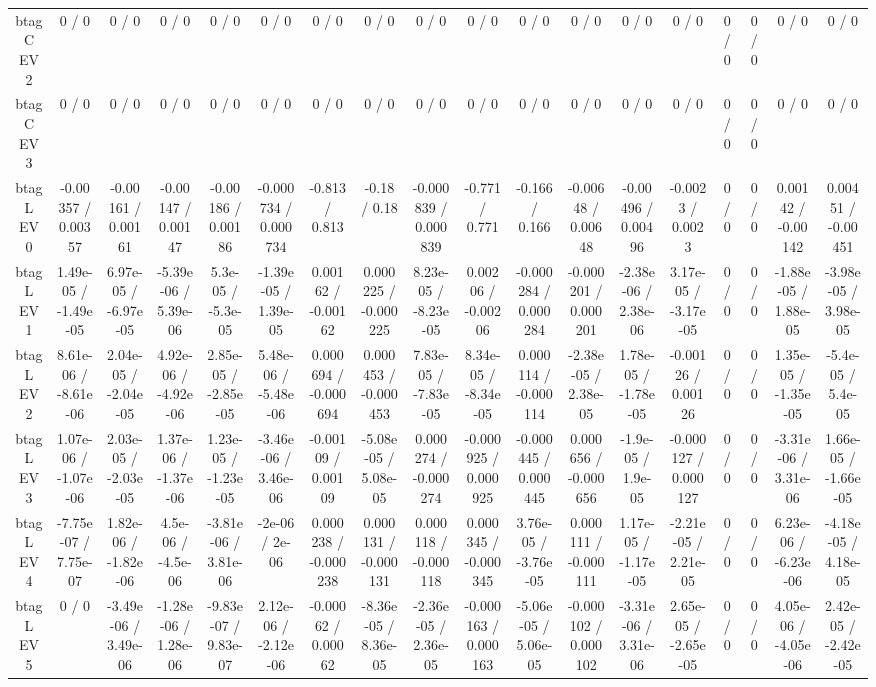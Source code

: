 \documentclass[10pt]{article}
\begin{document}
\begin{table}[htbp]
\begin{center}
\begin{tabular}{|c|c|c|c|c|c|c|c|c|c|c|c|c|c|c|c|c|c|}
  btag C EV 2 & 0 / 0 & 0 / 0 & 0 / 0 & 0 / 0 & 0 / 0 & 0 / 0 & 0 / 0 & 0 / 0 & 0 / 0 & 0 / 0 & 0 / 0 & 0 / 0 & 0 / 0 & 0 / 0 & 0 / 0 & 0 / 0 & 0 / 0 \\ 
  btag C EV 3 & 0 / 0 & 0 / 0 & 0 / 0 & 0 / 0 & 0 / 0 & 0 / 0 & 0 / 0 & 0 / 0 & 0 / 0 & 0 / 0 & 0 / 0 & 0 / 0 & 0 / 0 & 0 / 0 & 0 / 0 & 0 / 0 & 0 / 0 \\ 
  btag L EV 0 & -0.00357 / 0.00357 & -0.00161 / 0.00161 & -0.00147 / 0.00147 & -0.00186 / 0.00186 & -0.000734 / 0.000734 & -0.813 / 0.813 & -0.18 / 0.18 & -0.000839 / 0.000839 & -0.771 / 0.771 & -0.166 / 0.166 & -0.00648 / 0.00648 & -0.00496 / 0.00496 & -0.0023 / 0.0023 & 0 / 0 & 0 / 0 & 0.00142 / -0.00142 & 0.00451 / -0.00451 \\ 
  btag L EV 1 & 1.49e-05 / -1.49e-05 & 6.97e-05 / -6.97e-05 & -5.39e-06 / 5.39e-06 & 5.3e-05 / -5.3e-05 & -1.39e-05 / 1.39e-05 & 0.00162 / -0.00162 & 0.000225 / -0.000225 & 8.23e-05 / -8.23e-05 & 0.00206 / -0.00206 & -0.000284 / 0.000284 & -0.000201 / 0.000201 & -2.38e-06 / 2.38e-06 & 3.17e-05 / -3.17e-05 & 0 / 0 & 0 / 0 & -1.88e-05 / 1.88e-05 & -3.98e-05 / 3.98e-05 \\ 
  btag L EV 2 & 8.61e-06 / -8.61e-06 & 2.04e-05 / -2.04e-05 & 4.92e-06 / -4.92e-06 & 2.85e-05 / -2.85e-05 & 5.48e-06 / -5.48e-06 & 0.000694 / -0.000694 & 0.000453 / -0.000453 & 7.83e-05 / -7.83e-05 & 8.34e-05 / -8.34e-05 & 0.000114 / -0.000114 & -2.38e-05 / 2.38e-05 & 1.78e-05 / -1.78e-05 & -0.00126 / 0.00126 & 0 / 0 & 0 / 0 & 1.35e-05 / -1.35e-05 & -5.4e-05 / 5.4e-05 \\ 
  btag L EV 3 & 1.07e-06 / -1.07e-06 & 2.03e-05 / -2.03e-05 & 1.37e-06 / -1.37e-06 & 1.23e-05 / -1.23e-05 & -3.46e-06 / 3.46e-06 & -0.00109 / 0.00109 & -5.08e-05 / 5.08e-05 & 0.000274 / -0.000274 & -0.000925 / 0.000925 & -0.000445 / 0.000445 & 0.000656 / -0.000656 & -1.9e-05 / 1.9e-05 & -0.000127 / 0.000127 & 0 / 0 & 0 / 0 & -3.31e-06 / 3.31e-06 & 1.66e-05 / -1.66e-05 \\ 
  btag L EV 4 & -7.75e-07 / 7.75e-07 & 1.82e-06 / -1.82e-06 & 4.5e-06 / -4.5e-06 & -3.81e-06 / 3.81e-06 & -2e-06 / 2e-06 & 0.000238 / -0.000238 & 0.000131 / -0.000131 & 0.000118 / -0.000118 & 0.000345 / -0.000345 & 3.76e-05 / -3.76e-05 & 0.000111 / -0.000111 & 1.17e-05 / -1.17e-05 & -2.21e-05 / 2.21e-05 & 0 / 0 & 0 / 0 & 6.23e-06 / -6.23e-06 & -4.18e-05 / 4.18e-05 \\ 
  btag L EV 5 & 0 / 0 & -3.49e-06 / 3.49e-06 & -1.28e-06 / 1.28e-06 & -9.83e-07 / 9.83e-07 & 2.12e-06 / -2.12e-06 & -0.00062 / 0.00062 & -8.36e-05 / 8.36e-05 & -2.36e-05 / 2.36e-05 & -0.000163 / 0.000163 & -5.06e-05 / 5.06e-05 & -0.000102 / 0.000102 & -3.31e-06 / 3.31e-06 & 2.65e-05 / -2.65e-05 & 0 / 0 & 0 / 0 & 4.05e-06 / -4.05e-06 & 2.42e-05 / -2.42e-05 \\ 

\end{tabular}
\end{center}
\end{table}
\end{document}
